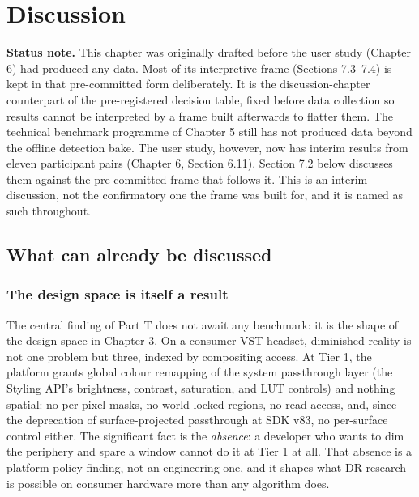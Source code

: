\chapter{Discussion}

\textbf{Status note.} This chapter was originally drafted before the user study (Chapter 6) had
produced any data. Most of its interpretive frame (Sections 7.3–7.4) is kept in that pre-committed
form deliberately. It is the discussion-chapter counterpart of the pre-registered decision table,
fixed before data collection so results cannot be interpreted by a frame built afterwards to flatter
them. The technical benchmark programme of Chapter 5 still has not produced data beyond the offline
detection bake. The user study, however, now has interim results from eleven participant pairs
(Chapter 6, Section 6.11). Section 7.2 below discusses them against the pre-committed frame that
follows it. This is an interim discussion, not the confirmatory one the frame was built for, and it
is named as such throughout.

\section{What can already be discussed}

\subsection{The design space is itself a result}

The central finding of Part T does not await any benchmark: it is the shape of the design space in
Chapter 3. On a consumer VST headset, diminished reality is not one problem but three, indexed by
compositing access. At Tier 1, the platform grants global colour remapping of the system passthrough
layer (the Styling API's brightness, contrast, saturation, and LUT controls) and nothing spatial: no
per-pixel masks, no world-locked regions, no read access, and, since the deprecation of
surface-projected passthrough at SDK v83, no per-surface control either. The significant fact is
the \textit{absence}: a developer who wants to dim the periphery and spare a window cannot do it at Tier 1
at all. That absence is a platform-policy finding, not an engineering one, and it shapes what DR
research is possible on consumer hardware more than any algorithm does.

